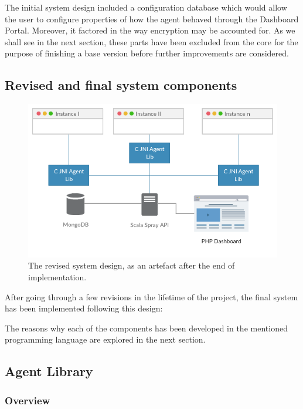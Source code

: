 The initial system design included a configuration database which would allow the user to configure properties of how the agent behaved through the Dashboard Portal. Moreover, it factored in the way encryption may be accounted for. As we shall see in the next section, these parts have been excluded from the core for the purpose of finishing a base version before further improvements are considered.

\subsection{Revised and final system components} 

\begin{figure}[H]
  \centering
    \includegraphics[width=\textwidth]{end-design.png} 
  \caption[Revised system design diagram]{The revised system design, as an artefact after the end of implementation.}

\end{figure}

After going through a few revisions in the lifetime of the project, the final system has been implemented following this design:



The reasons why each of the components has been developed in the mentioned programming language are explored in the next section.

\subsection{Agent Library}
\subsubsection{Overview}

